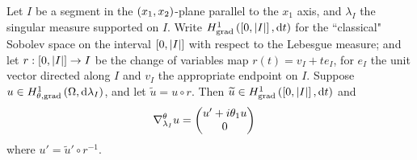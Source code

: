 \begin{lemma} \label{lem:TangentialQMGradientSegmentParallel}
	Let $I$ be a segment in the $\left( x_1,x_2 \right)$-plane parallel to the $x_1$ axis, and $\lambda_I$ the singular measure supported on $I$.
	Write $H^1_\mathrm{grad}\left( \left[ 0,\left\lvert I \right\rvert \right], \mathrm{d}t \right)$ for the ``classical" Sobolev space on the interval $\left[ 0,\left\lvert I \right\rvert \right]$ with respect to the Lebesgue measure; and let $r:\left[ 0,\left\lvert I \right\rvert \right]\rightarrow I$ be the change of variables map $r(t) = v_I + te_I$, for $e_I$ the unit vector directed along $I$ and $v_I$ the appropriate endpoint on $I$.
	Suppose $u\in H^1_{\theta, \mathrm{grad}}\left( \Omega, \mathrm{d}\lambda_I \right)$, and let $\widetilde{u} = u\circ r$. \newline
	Then $\widetilde{u} \in H^1_\mathrm{grad}\left( \left[ 0,\left\lvert I \right\rvert \right], \mathrm{d}t \right)$ and
	\begin{align*}
		\nabla_{\lambda_I}^\theta u &= \begin{pmatrix} u' + i\theta_1 u \\ 0	\end{pmatrix}
	\end{align*}
	where $u' = \widetilde{u}' \circ r^{-1}$.
\end{lemma}
